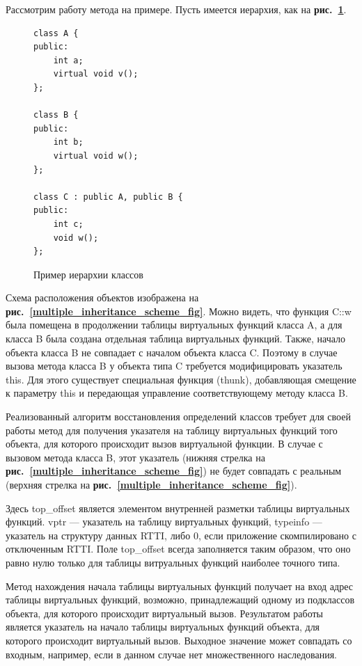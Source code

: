 \documentclass[a4paper,12pt,russian]{article}
\newcommand{\picref}[1]{\textbf{рис.~\ref{#1}}}
\newcommand{\code}[1]{\textsf{#1}}
\begin{document}
Рассмотрим работу метода на примере. Пусть имеется иерархия, как на \picref{vtable_start_ex_lst}.
\begin{figure}
\begin{lstlisting}
class A {
public:
    int a;
    virtual void v();
};

class B {
public:
    int b;
    virtual void w();
};

class C : public A, public B {
public:
    int c;
    void w();
};
\end{lstlisting}
\caption{Пример иерархии классов}
\label{vtable_start_ex_lst}
\end{figure}
Схема расположения объектов изображена на \picref{multiple_inheritance_scheme_fig}.
Можно видеть, что функция \code{C::w} была помещена в продолжении таблицы виртуальных функций класса \code{A}, а для класса \code{B} была создана отдельная таблица виртуальных функций.
Также, начало объекта класса \code{B} не совпадает с началом объекта класса \code{C}.
Поэтому в случае вызова метода класса \code{B} у объекта типа \code{C} требуется модифицировать указатель \code{this}.
Для этого существует специальная функция (\code{thunk}), добавляющая смещение к параметру \code{this} и передающая управление соответствующему методу класса \code{B}.

Реализованный алгоритм восстановления определений классов требует для своей работы метод для получения указателя на таблицу виртуальных функций того объекта, для которого происходит вызов виртуальной функции.
В случае с вызовом метода класса \code{B}, этот указатель (нижняя стрелка на \picref{multiple_inheritance_scheme_fig}) не будет совпадать с реальным (верхняя стрелка на \picref{multiple_inheritance_scheme_fig}).

Здесь \code{top\_offset} является элементом внутренней разметки таблицы виртуальных функций.
\code{vptr} --- указатель на таблицу виртуальных функций, \code{typeinfo} --- указатель на структуру данных \code{RTTI}, либо $0$, если приложение скомпилировано с отключенным \code{RTTI}.
Поле \code{top\_offset} всегда заполняется таким образом, что оно равно нулю только для таблицы витруальных функций наиболее точного типа.

Метод нахождения начала таблицы виртуальных функций получает на вход адрес таблицы виртуальных функций, возможно, принадлежащий одному из подклассов объекта, для которого происходит виртуальный вызов.
Результатом работы является указатель на начало таблицы виртуальных функций объекта, для которого происходит виртуальный вызов.
Выходное значение может совпадать со входным, например, если в данном случае нет множественного наследования.
\end{document}
